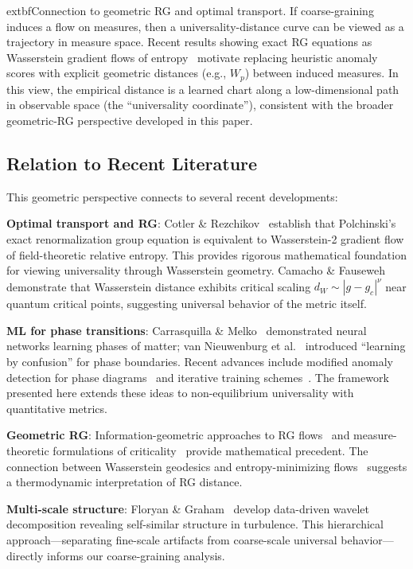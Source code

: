 \documentclass[aps,pre,reprint,amsmath,amssymb,superscriptaddress]{revtex4-2}
\begin{document}
	extbf{Connection to geometric RG and optimal transport.} If coarse-graining induces a flow on measures, then a universality-distance curve can be viewed as a trajectory in measure space. Recent results showing exact RG equations as Wasserstein gradient flows of entropy~\cite{CotlerRezchikov2023,Villani2009} motivate replacing heuristic anomaly scores with explicit geometric distances (e.g., $W_p$) between induced measures. In this view, the empirical distance is a learned chart along a low-dimensional path in observable space (the ``universality coordinate''), consistent with the broader geometric-RG perspective developed in this paper.

\subsection{Relation to Recent Literature}

This geometric perspective connects to several recent developments:

\textbf{Optimal transport and RG}: Cotler \& Rezchikov~\cite{CotlerRezchikov2023} establish that Polchinski's exact renormalization group equation is equivalent to Wasserstein-2 gradient flow of field-theoretic relative entropy. This provides rigorous mathematical foundation for viewing universality through Wasserstein geometry. Camacho \& Fauseweh~\cite{CamachoFauseweh2025} demonstrate that Wasserstein distance exhibits critical scaling $d_W \sim |g - g_c|^\nu$ near quantum critical points, suggesting universal behavior of the metric itself.

\textbf{ML for phase transitions}: Carrasquilla \& Melko~\cite{Carrasquilla2017} demonstrated neural networks learning phases of matter; van Nieuwenburg et al.~\cite{vanNieuwenburg2017} introduced ``learning by confusion'' for phase boundaries. Recent advances include modified anomaly detection for phase diagrams~\cite{Liu2023} and iterative training schemes~\cite{Zhang2023}. The framework presented here extends these ideas to non-equilibrium universality with quantitative metrics.

\textbf{Geometric RG}: Information-geometric approaches to RG flows~\cite{Amari2016,Machta2013} and measure-theoretic formulations of criticality~\cite{Hauru2021,Beny2015} provide mathematical precedent. The connection between Wasserstein geodesics and entropy-minimizing flows~\cite{Villani2009} suggests a thermodynamic interpretation of RG distance.

\textbf{Multi-scale structure}: Floryan \& Graham~\cite{FloryanGraham2020} develop data-driven wavelet decomposition revealing self-similar structure in turbulence. This hierarchical approach---separating fine-scale artifacts from coarse-scale universal behavior---directly informs our coarse-graining analysis.
\end{document}
